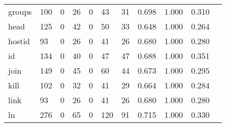 \begin{longtable}{lp{1.10cm}p{1.10cm}p{1.10cm}p{1.10cm}p{1.10cm}p{1.10cm}p{1.10cm}p{1.10cm}p{1.10cm}p{1.10cm}}
groups    &                    100 &                                  0 &                                26 &                                0 &                                43 &                              31 &                          0.698 &                                 1.000 &                               0.310 \\
head      &                    125 &                                  0 &                                42 &                                0 &                                50 &                              33 &                          0.648 &                                 1.000 &                               0.264 \\
hostid    &                     93 &                                  0 &                                26 &                                0 &                                41 &                              26 &                          0.680 &                                 1.000 &                               0.280 \\
id        &                    134 &                                  0 &                                40 &                                0 &                                47 &                              47 &                          0.688 &                                 1.000 &                               0.351 \\
join      &                    149 &                                  0 &                                45 &                                0 &                                60 &                              44 &                          0.673 &                                 1.000 &                               0.295 \\
kill      &                    102 &                                  0 &                                32 &                                0 &                                41 &                              29 &                          0.664 &                                 1.000 &                               0.284 \\
link      &                     93 &                                  0 &                                26 &                                0 &                                41 &                              26 &                          0.680 &                                 1.000 &                               0.280 \\
ln        &                    276 &                                  0 &                                65 &                                0 &                               120 &                              91 &                          0.715 &                                 1.000 &                               0.330 \\

\end{longtable}
